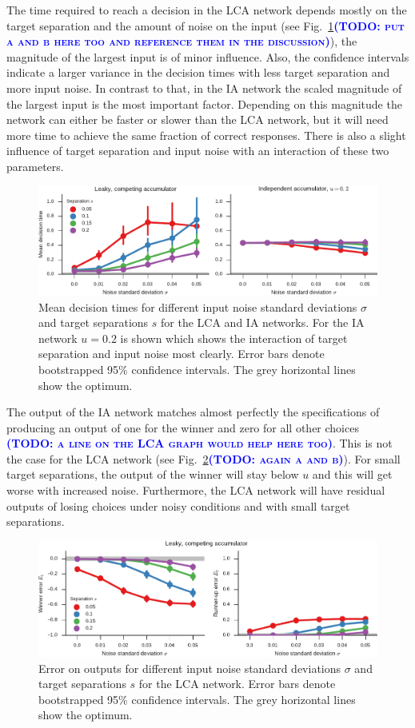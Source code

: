 \documentclass[10pt,letterpaper]{article}
\makeatletter
\newcommand{\todo}[1]{\textbf{\textsc{\textcolor{blue}{(TODO\@: #1)}}}}
\makeatother
\begin{document}
The time required to reach a decision in the LCA network depends mostly on the target separation and the amount of noise on the input (see Fig.~\ref{fig:time}\todo{put a and b here too and reference them in the discussion}), the magnitude of the largest input is of minor influence.
Also, the confidence intervals indicate a larger variance in the decision times with less target separation and more input noise.
In contrast to that, in the IA network the scaled magnitude of the largest input is the most important factor.
Depending on this magnitude the network can either be faster or slower than the LCA network, but it will need more time to achieve the same fraction of correct responses.
There is also a slight influence of target separation and input noise with an interaction of these two parameters.
\begin{figure}
    \centering
    \includegraphics{figures/time}
    \caption{ \label{fig:time}
        Mean decision times for different input noise standard deviations $\sigma$ and target separations $s$ for the LCA and IA networks.
        For the IA network $u = 0.2$ is shown which shows the interaction of target separation and input noise most clearly.
        Error bars denote bootstrapped 95\% confidence intervals.
        The grey horizontal lines show the optimum.
    }
\end{figure}

The output of the IA network matches almost perfectly the specifications of producing an output of one for the winner and zero for all other choices \todo{a line on the LCA graph would help here too}.
This is not the case for the LCA network (see Fig.~\ref{fig:error}\todo{again a and b}).
For small target separations, the output of the winner will stay below $u$ and this will get worse with increased noise.
Furthermore, the LCA network will have residual outputs of losing choices under noisy conditions and with small target separations.
\begin{figure}
    \centering
    \includegraphics{figures/error}
    \caption{ \label{fig:error}
        Error on outputs for different input noise standard deviations $\sigma$ and target separations $s$ for the LCA network.
        Error bars denote bootstrapped 95\% confidence intervals.
        The grey horizontal lines show the optimum.
    }
\end{figure}
\end{document}
